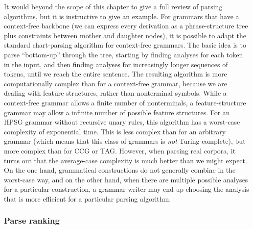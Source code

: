 \documentclass[output=paper]{langsci/langscibook}
\begin{document}
It would beyond the scope of this chapter
to give a full review of parsing algorithms,
but it is instructive to give an example.
For grammars that have a context-free backbone
(we can express every derivation as a phrase-structure tree
plus constraints between mother and daughter nodes),
it is possible to adapt the standard chart-parsing algorithm for context-free grammars.
The basic idea is to parse ``bottom-up'' through the tree,
starting by finding analyses for each token in the input,
and then finding analyses for increasingly longer sequences of tokens,
until we reach the entire sentence.
The resulting algorithm is more computationally complex than for a context-free grammar,
because we are dealing with feature structures, rather than nonterminal symbols.
While a context-free grammar allows a finite number of nonterminals,
a feature-structure grammar may allow a infinite number of possible feature structures.
For an HPSG grammar without recursive unary rules,
this algorithm has a worst-case complexity of exponential time.
This is less complex than for an arbitrary grammar
(which means that this class of grammars is \textit{not} Turing-complete),
but more complex than for CCG or TAG.
However, when parsing real corpora,
it turns out that the average-case complexity is much better than we might expect.
On the one hand, grammatical constructions do not generally combine in the worst-case way,
and on the other hand, when there are multiple possible analyses for a particular construction,
a grammar writer may end up choosing the analysis that is more efficient for a particular parsing algorithm.




\subsubsection{Parse ranking}
\label{cl:prac:rank}

\end{document}
